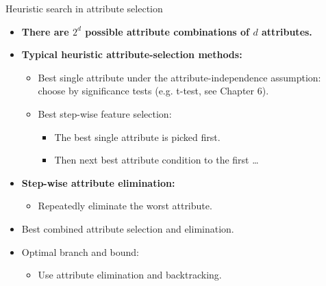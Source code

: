 \documentclass[aspectratio=169,t]{beamer}
\begin{document}
  { 
    \begin{frame}{Heuristic search in attribute selection}
    \begin{itemize}
      \item \textbf{There are $2^d$ possible attribute combinations of $d$ attributes.}
      \item\textbf{\color{airforceblue}Typical heuristic attribute-selection methods:}
      \begin{itemize}
        \item Best single attribute under the attribute-independence assumption: \\ choose by significance tests (e.g. t-test, see Chapter 6).
        \item Best step-wise feature selection:
        \begin{itemize}
          \item The best single attribute is picked first.
          \item Then next best attribute condition to the first \ldots
        \end{itemize}
      \end{itemize}
      \item \textbf{\color{airforceblue}Step-wise attribute elimination:}
      \begin{itemize}
        \item Repeatedly eliminate the worst attribute.
      \end{itemize}
      \item Best combined attribute selection and elimination.
      \item Optimal branch and bound:
      \begin{itemize}
        \item Use attribute elimination and backtracking.
      \end{itemize}
    \end{itemize}
    \end{frame}
  }
\end{document}

